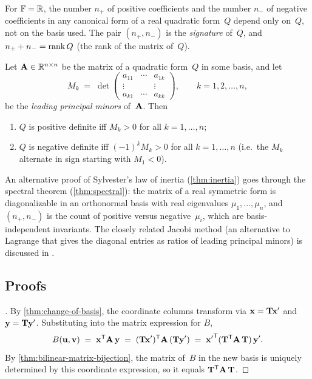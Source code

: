 \begin{theorem}
\label{thm:inertia}
For $\mathbb{F} = \mathbb{R}$, the number $n_+$ of positive coefficients and the number
$n_-$ of negative coefficients in any canonical form of a real
quadratic form~$Q$ depend only on~$Q$, not on the basis used. The pair
$(n_+, n_-)$ is the \emph{signature} of~$Q$, and $n_+ + n_- = \operatorname{rank} Q$
(the rank of the matrix of~$Q$).
\end{theorem}

\begin{theorem}
\label{thm:sylvester}
Let $\mathbf{A} \in \mathbb{R}^{n \times n}$ be the matrix of a quadratic
form~$Q$ in some basis, and let
\[
  M_k \;=\; \det \begin{pmatrix} a_{11} & \cdots & a_{1k} \\ \vdots & & \vdots \\ a_{k1} & \cdots & a_{kk} \end{pmatrix},
  \qquad k = 1, 2, \dots, n,
\]
be the \emph{leading principal minors} of~$\mathbf{A}$. Then
\begin{enumerate}[label=(\alph*)]
  \item $Q$ is positive definite iff $M_k > 0$ for all $k = 1, \dots, n$;
  \item $Q$ is negative definite iff $(-1)^k M_k > 0$ for all $k = 1, \dots, n$
        (i.e.\ the $M_k$ alternate in sign starting with $M_1 < 0$).
\end{enumerate}
\end{theorem}

\begin{remark}
An alternative proof of Sylvester's law of inertia
(\cref{thm:inertia}) goes through the spectral theorem
(\cref{thm:spectral}): the matrix of a real symmetric form is
diagonalizable in an orthonormal basis with real eigenvalues
$\mu_1, \dots, \mu_n$, and $(n_+, n_-)$ is the count of positive
versus negative~$\mu_i$, which are basis-independent invariants. The
closely related Jacobi method (an alternative to Lagrange that gives
the diagonal entries as ratios of leading principal minors) is
discussed in \cite{Beklemishev2025}.
\end{remark}

\subsection*{Proofs}

\begin{proof}[]
By \cref{thm:change-of-basis}, the coordinate columns transform via
$\mathbf{x} = \mathbf{T} \mathbf{x}'$ and $\mathbf{y} = \mathbf{T} \mathbf{y}'$.
Substituting into the matrix expression for $B$,
\[
  B(\mathbf{u}, \mathbf{v}) \;=\; \mathbf{x}^{\mathsf{T}} \mathbf{A}\, \mathbf{y}
  \;=\; (\mathbf{T}\mathbf{x}')^{\mathsf{T}} \mathbf{A}\, (\mathbf{T}\mathbf{y}')
  \;=\; {\mathbf{x}'}^{\mathsf{T}} (\mathbf{T}^{\mathsf{T}} \mathbf{A}\, \mathbf{T})\, {\mathbf{y}'}.
\]
By \cref{thm:bilinear-matrix-bijection}, the matrix of~$B$ in the new
basis is uniquely determined by this coordinate expression, so it
equals $\mathbf{T}^{\mathsf{T}} \mathbf{A}\, \mathbf{T}$.
\end{proof}

